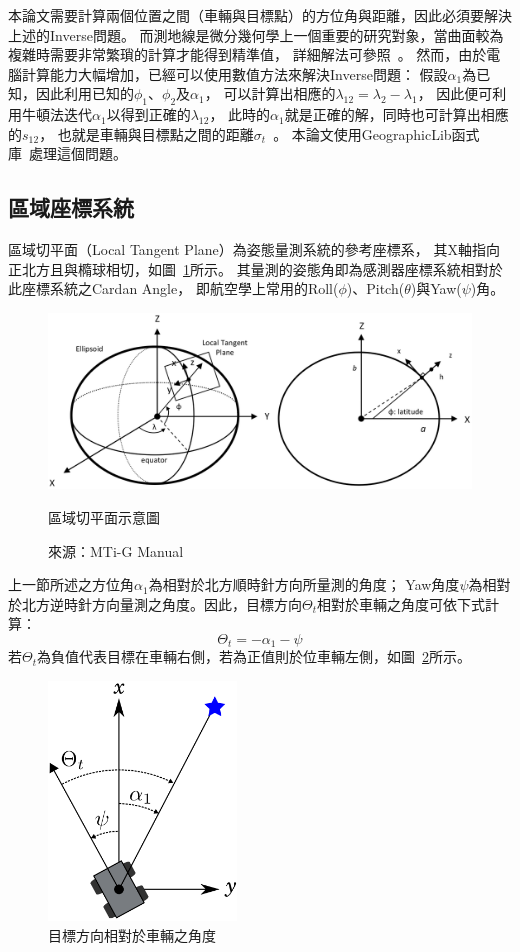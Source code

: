 本論文需要計算兩個位置之間（車輛與目標點）的方位角與距離，因此必須要解決上述的Inverse問題。
而測地線是微分幾何學上一個重要的研究對象，當曲面較為複雜時需要非常繁瑣的計算才能得到精準值，
詳細解法可參照~\cite{Karney:2013:Algorithms_for_Geodesics,Jekeli:2006:GRSinGeodesy}。
然而，由於電腦計算能力大幅增加，已經可以使用數值方法來解決Inverse問題：
假設$\alpha_1$為已知，因此利用已知的$\phi_1$、$\phi_2$及$\alpha_1$，
可以計算出相應的$\lambda_{12} = \lambda_2 - \lambda_1$，
因此便可利用牛頓法迭代$\alpha_1$以得到正確的$\lambda_{12}$，
此時的$\alpha_1$就是正確的解，同時也可計算出相應的$s_{12}$，
也就是車輛與目標點之間的距離$\sigma_t$~\cite{Karney:2013:Algorithms_for_Geodesics}。
本論文使用GeographicLib函式庫~\cite{website:GeographicLib}處理這個問題。

\subsection{區域座標系統}
區域切平面（Local Tangent Plane）為姿態量測系統的參考座標系，
其X軸指向正北方且與橢球相切，如圖~\ref{f:LTP}所示。
其量測的姿態角即為感測器座標系統相對於此座標系統之Cardan Angle，
即航空學上常用的Roll($\phi$)、Pitch($\theta$)與Yaw($\psi$)角。
\begin{figure}[h!]
	\centering
	\includegraphics[width=\textwidth]{figures/LTP}
	\caption{區域切平面示意圖}
	\caption*{來源：MTi-G Manual}
	\label{f:LTP}
\end{figure}

上一節所述之方位角$\alpha_1$為相對於北方順時針方向所量測的角度；
Yaw角度$\psi$為相對於北方逆時針方向量測之角度。因此，目標方向$\Theta_t$相對於車輛之角度可依下式計算：
\begin{equation}
	\Theta_t = -\alpha_1 - \psi
\end{equation}
若$\Theta_t$為負值代表目標在車輛右側，若為正值則於位車輛左側，如圖~\ref{f:target_angle}所示。
\begin{figure}[h!]
	\centering
	\includegraphics[width=5cm]{figures/TargetAngle}
	\caption{目標方向相對於車輛之角度}
	\label{f:target_angle}
\end{figure}

